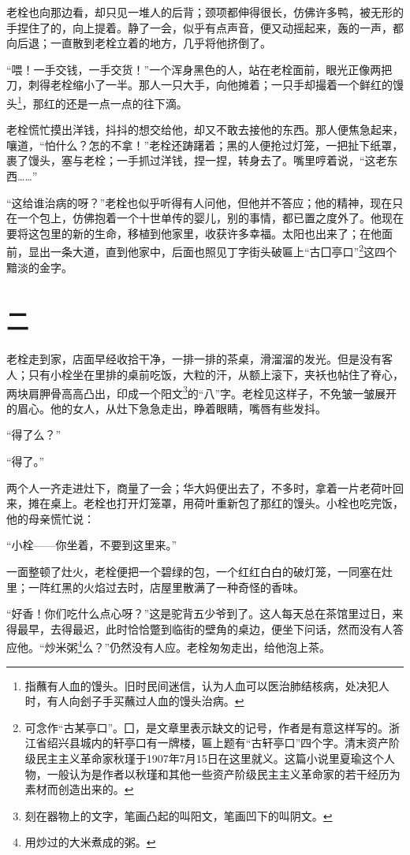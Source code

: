\documentclass[12pt,UTF8]{ctexbook}
\begin{document}
老栓也向那边看，却只见一堆人的后背；颈项都伸得很长，仿佛许多鸭，被无形的手捏住了的，向上提着。静了一会，似乎有点声音，便又动摇起来，轰的一声，都向后退；一直散到老栓立着的地方，几乎将他挤倒了。

“喂！一手交钱，一手交货！”一个浑身黑色的人，站在老栓面前，眼光正像两把刀，刺得老栓缩小了一半。那人一只大手，向他摊着；一只手却撮着一个鲜红的馒头\footnote{指蘸有人血的馒头。旧时民间迷信，认为人血可以医治肺结核病，处决犯人时，有人向刽子手买蘸过人血的馒头治病。}，那红的还是一点一点的往下滴。

老栓慌忙摸出洋钱，抖抖的想交给他，却又不敢去接他的东西。那人便焦急起来，嚷道，“怕什么？怎的不拿！”老栓还踌躇着；黑的人便抢过灯笼，一把扯下纸罩，裹了馒头，塞与老栓；一手抓过洋钱，捏一捏，转身去了。嘴里哼着说，“这老东西……”

“这给谁治病的呀？”老栓也似乎听得有人问他，但他并不答应；他的精神，现在只在一个包上，仿佛抱着一个十世单传的婴儿，别的事情，都已置之度外了。他现在要将这包里的新的生命，移植到他家里，收获许多幸福。太阳也出来了；在他面前，显出一条大道，直到他家中，后面也照见丁字街头破匾上“古囗亭口”\footnote{可念作“古某亭口”。囗，是文章里表示缺文的记号，作者是有意这样写的。浙江省绍兴县城内的轩亭口有一牌楼，匾上题有“古轩亭口”四个字。清末资产阶级民主主义革命家秋瑾于1907年7月15日在这里就义。这篇小说里夏瑜这个人物，一般认为是作者以秋瑾和其他一些资产阶级民主主义革命家的若干经历为素材而创造出来的。}这四个黯淡的金字。

\chapter{二}

老栓走到家，店面早经收拾干净，一排一排的茶桌，滑溜溜的发光。但是没有客人；只有小栓坐在里排的桌前吃饭，大粒的汗，从额上滚下，夹袄也帖住了脊心，两块肩胛骨高高凸出，印成一个阳文\footnote{刻在器物上的文字，笔画凸起的叫阳文，笔画凹下的叫阴文。}的“八”字。老栓见这样子，不免皱一皱展开的眉心。他的女人，从灶下急急走出，睁着眼睛，嘴唇有些发抖。

“得了么？”

“得了。”

两个人一齐走进灶下，商量了一会；华大妈便出去了，不多时，拿着一片老荷叶回来，摊在桌上。老栓也打开灯笼罩，用荷叶重新包了那红的馒头。小栓也吃完饭，他的母亲慌忙说：

“小栓——你坐着，不要到这里来。”

一面整顿了灶火，老栓便把一个碧绿的包，一个红红白白的破灯笼，一同塞在灶里；一阵红黑的火焰过去时，店屋里散满了一种奇怪的香味。

“好香！你们吃什么点心呀？”这是驼背五少爷到了。这人每天总在茶馆里过日，来得最早，去得最迟，此时恰恰蹩到临街的壁角的桌边，便坐下问话，然而没有人答应他。“炒米粥\footnote{用炒过的大米煮成的粥。}么？”仍然没有人应。老栓匆匆走出，给他泡上茶。
\end{document}

